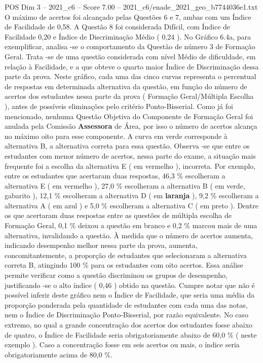 \begin{textsample}{POS Dim 3 – 2021\_c6 – Score 7.00 – 2021\_c6/enade\_2021\_geo\_b7744036e1.txt}
O máximo de acertos foi alcançado pelas Questões 6 e 7, ambas com um Índice de Facilidade de 0,58.
A Questão 8 foi considerada Difícil, com Índice de Facilidade 0,20 e Índice de Discriminação Médio ( 0,24 ).
No Gráfico 6.4a, para exemplificar, analisa -se o comportamento da Questão de número 3 de Formação Geral.
Trata -se de uma questão considerada com nível Médio de dificuldade, em relação à Facilidade, e a que obteve o quarto maior Índice de Discriminação dessa parte da prova.
Neste gráfico, cada uma das cinco curvas representa o percentual de respostas em determinada alternativa da questão, em função do número de acertos dos estudantes nessa parte da prova ( Formação Geral/Múltipla Escolha ), antes de possíveis eliminações pelo critério Ponto-Bisserial.
Como já foi mencionado, nenhuma Questão Objetiva do Componente de Formação Geral foi anulada pela Comissão \textbf{Assessora} de Área, por isso o número de acertos alcança no máximo oito para esse componente.
A curva em verde corresponde à alternativa B, a alternativa correta para essa questão.
Observa -se que entre os estudantes com menor número de acertos, nessa parte do exame, a situação mais frequente foi a escolha da alternativa E ( em vermelho ), incorreta.
Por exemplo, entre os estudantes que acertaram duas respostas, 46,3 \% escolheram a alternativa E ( em vermelho ), 27,0 \% escolheram a alternativa B ( em verde, gabarito ), 12,1 \% escolheram a alternativa D ( em \textbf{laranja} ), 9,2 \% escolheram a alternativa A ( em azul ) e 5,0 \% escolheram a alternativa C ( em preto ).
Dentre os que acertaram duas respostas entre as questões de múltipla escolha de Formação Geral, 0,1 \% deixou a questão em branco e 0,2 \% marcou mais de uma alternativa, invalidando a questão.
À medida que o número de acertos aumenta, indicando desempenho melhor nessa parte da prova, aumenta, concomitantemente, a proporção de estudantes que selecionaram a alternativa correta B, atingindo 100 \% para os estudantes com oito acertos.
Essa análise permite verificar como a questão discriminou os grupos de desempenho, justificando -se o alto índice ( 0,46 ) obtido na questão.
Cumpre notar que não é possível inferir deste gráfico nem o Índice de Facilidade, que seria uma média da proporção ponderada pela quantidade de estudantes com cada uma das notas, nem o Índice de Discriminação Ponto-Bisserial, por razão equivalente.
No caso extremo, no qual a grande concentração dos acertos dos estudantes fosse abaixo de quatro, o Índice de Facilidade seria obrigatoriamente abaixo de 60,0 \% ( neste exemplo ).
Caso a concentração fosse em seis acertos ou mais, o índice seria obrigatoriamente acima de 80,0 \%.

\end{textsample}
